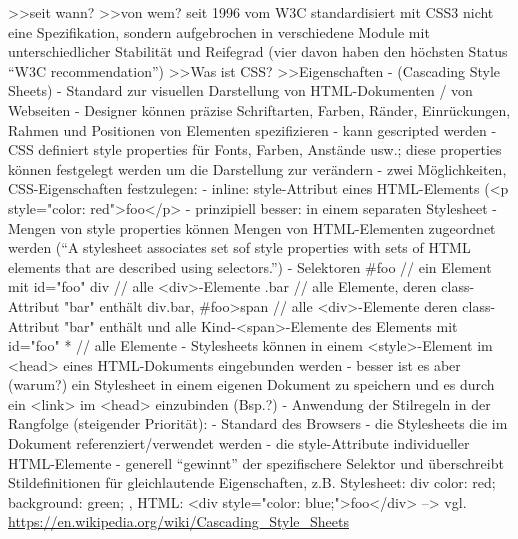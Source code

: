 \documentclass[a4paper, 12pt, listof=totoc, bibliography=totoc]{scrreprt}
\begin{document}
>>seit wann?
>>von wem?
  seit 1996 vom W3C standardisiert
  mit CSS3 nicht eine Spezifikation, sondern aufgebrochen in verschiedene Module mit unterschiedlicher Stabilität und Reifegrad (vier davon haben den höchsten Status "`W3C recommendation"')
>>Was ist CSS?
>>Eigenschaften
	- (Cascading Style Sheets)
	- Standard zur visuellen Darstellung von HTML-Dokumenten / von Webseiten
	- Designer können präzise Schriftarten, Farben, Ränder, Einrückungen, Rahmen und Positionen von Elementen spezifizieren
	- kann gescripted werden
	- CSS definiert style properties für Fonts, Farben, Anstände usw.; diese properties können festgelegt werden um die Darstellung zur verändern
	- zwei Möglichkeiten, CSS-Eigenschaften festzulegen:
		- inline: style-Attribut eines HTML-Elements (<p style="color: red">foo</p>
		- prinzipiell besser: in einem separaten Stylesheet
			- Mengen von style properties können Mengen von HTML-Elementen zugeordnet werden ("`A stylesheet associates set sof style properties with sets of HTML elements that are described using selectors."')
			- Selektoren
				\#foo // ein Element mit id="foo"
				div  // alle <div>-Elemente
				.bar // alle Elemente, deren class-Attribut "bar" enthält
				div.bar, \#foo>span // alle <div>-Elemente deren class-Attribut "bar" enthält und alle Kind-<span>-Elemente des Elements mit id="foo"
				* // alle Elemente
			- Stylesheets können in einem <style>-Element im <head> eines HTML-Dokuments eingebunden werden
			- besser ist es aber (warum?) ein Stylesheet in einem eigenen Dokument zu speichern und es durch ein <link> im <head> einzubinden (Bsp.?)
	- Anwendung der Stilregeln in der Rangfolge (steigender Priorität):
		- Standard des Browsers
		- die Stylesheets die im Dokument referenziert/verwendet werden
		- die style-Attribute individueller HTML-Elemente
		- generell "`gewinnt"' der spezifischere Selektor und überschreibt Stildefinitionen für gleichlautende Eigenschaften, z.B. Stylesheet: div { color: red; background: green; }, HTML: <div style="color: blue;">foo</div>
	-->  vgl. \cite[S. 413 ff.]{flanagan2011.JDG}
	\url{https://en.wikipedia.org/wiki/Cascading_Style_Sheets}
\end{document}

